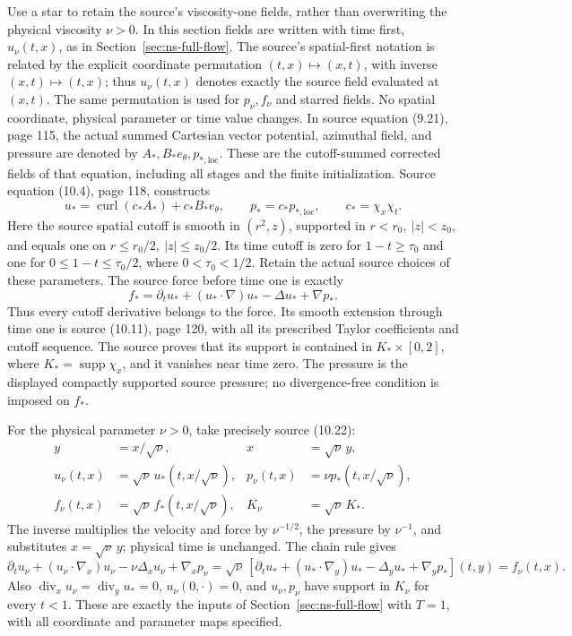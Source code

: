 Use a star to retain the source's viscosity-one fields, rather than
overwriting the physical viscosity $\nu>0$. In this section fields are
written with time first, $u_\nu(t,x)$, as in
Section~\ref{sec:ns-full-flow}. The source's spatial-first notation
is related by the explicit coordinate permutation
$(t,x)\mapsto(x,t)$, with inverse $(x,t)\mapsto(t,x)$; thus
$u_\nu(t,x)$ denotes exactly the source field evaluated at $(x,t)$.
The same permutation is used for $p_\nu,f_\nu$ and starred fields.
No spatial coordinate, physical parameter or time value changes.
In source equation (9.21),
page 115, the actual summed Cartesian vector potential, azimuthal field,
and pressure are denoted by $A_*,B_*e_\theta,p_{*,\mathrm{loc}}$.
These are the cutoff-summed corrected fields of that equation, including
all stages and the finite initialization. Source equation (10.4), page
118, constructs
\[
 u_* = \operatorname{curl}(c_*A_*)+c_*B_*e_\theta,
 \qquad p_*=c_*p_{*,\mathrm{loc}},\qquad c_*=\chi_x\chi_t.
\]
Here the source spatial cutoff is smooth in $(r^2,z)$, supported in
$r<r_0,\ |z|<z_0$, and equals one on
$r\leq r_0/2,\ |z|\leq z_0/2$. Its time cutoff is zero for
$1-t\geq\tau_0$ and one for $0\leq1-t\leq\tau_0/2$, where
$0<\tau_0<1/2$. Retain the actual source choices of these parameters.
The source force before time one is exactly
\[
 f_* = \partial_tu_*+(u_*\cdot\nabla)u_*
                     -\Delta u_*+\nabla p_*.
\]
Thus every cutoff derivative belongs to the force. Its smooth extension
through time one is source (10.11), page 120, with all its prescribed
Taylor coefficients and cutoff sequence. The source proves that its
support is contained in $K_*\times[0,2]$, where
$K_*=\operatorname{supp}\chi_x$, and it vanishes near time zero.
The pressure is the displayed compactly supported source pressure;
no divergence-free condition is imposed on $f_*$.

For the physical parameter $\nu>0$, take precisely source (10.22):
\begin{align*}
 y&=x/\sqrt\nu, & x&=\sqrt\nu\,y,\\
 u_\nu(t,x)&=\sqrt\nu\,u_*(t,x/\sqrt\nu),&
 p_\nu(t,x)&=\nu p_*(t,x/\sqrt\nu),\\
 f_\nu(t,x)&=\sqrt\nu\,f_*(t,x/\sqrt\nu),&
 K_\nu&=\sqrt\nu\,K_*.
\end{align*}
The inverse multiplies the velocity and force by $\nu^{-1/2}$,
the pressure by $\nu^{-1}$, and substitutes $x=\sqrt\nu\,y$;
physical time is unchanged. The chain rule gives
\[
 \partial_tu_\nu+(u_\nu\cdot\nabla_x)u_\nu
       -\nu\Delta_xu_\nu+\nabla_xp_\nu
 =\sqrt\nu\,[\partial_tu_*+(u_*\cdot\nabla_y)u_*
                    -\Delta_yu_*+\nabla_yp_*](t,y)=f_\nu(t,x).
\]
Also $\operatorname{div}_xu_\nu=\operatorname{div}_yu_*=0$,
$u_\nu(0,\cdot)=0$, and $u_\nu,p_\nu$ have support in $K_\nu$ for every
$t<1$. These are exactly the inputs of Section~\ref{sec:ns-full-flow} with
$T=1$, with all coordinate and parameter maps specified.

